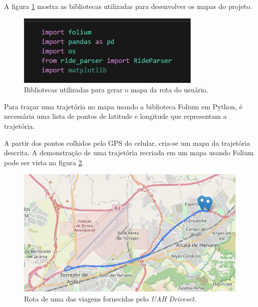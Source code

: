     
    A figura 
    \ref{fig:python_libs} mostra as bibliotecas utilizadas para desenvolver os mapas do projeto.
    
    \begin{figure}[hp]
        \centering
        
        \includegraphics[scale=0.8]{figures/bibliotecas.jpg}
        
        \caption{Bibliotecas utilizadas para gerar o mapa da rota do usuário.}
        
        \label{fig:python_libs}
    \end{figure}
    
            
    Para traçar uma trajetória no mapa usando a biblioteca Folium em Python, é necessária uma lista de pontos de latitude e longitude que representam a trajetória. 
    
    A partir dos pontos colhidos pelo GPS do celular, cria-se um mapa da trajetória descrita. A demonstração de uma trajetória recriada em um mapa usando Folium pode ser vista na figura \ref{fig:car_route_1}.
    
    \begin{figure}[hp]
        \centering
        
        \includegraphics[scale=0.8]{figures/rota_1.jpg}
        
        \caption{Rota de uma das viagens fornecidas pelo \textit{UAH Driveset}.}
        
        \label{fig:car_route_1}
    \end{figure}
    
